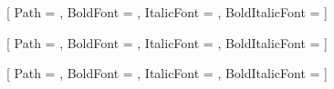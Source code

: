 
\usepackage{fontspec}
\usepackage{polyglossia}


\setmainfont{\ConfigFontRegular}[
    Path = \ConfigFontPath,
    BoldFont = \ConfigFontBold,
    ItalicFont = \ConfigFontItalic,
    BoldItalicFont = \ConfigFontBoldItalic
]


\newfontfamily\cyrillicfont{\ConfigFontRegular}[
    Path = \ConfigFontPath,
    BoldFont = \ConfigFontBold,
    ItalicFont = \ConfigFontItalic,
    BoldItalicFont = \ConfigFontBoldItalic
]


\newfontfamily\cyrillicfonttt{\ConfigFontRegular}[
    Path = \ConfigFontPath,
    BoldFont = \ConfigFontBold,
    ItalicFont = \ConfigFontItalic,
    BoldItalicFont = \ConfigFontBoldItalic
]


\setmainlanguage{russian}
